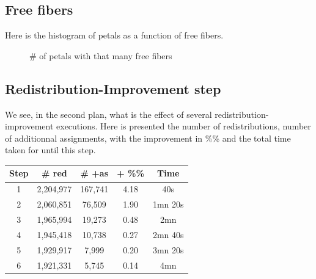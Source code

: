 \documentclass{extarticle}
\begin{document}
\begin{multicols}{2}

\subsection{Free fibers}
Here is the histogram of petals as a function of free fibers.
\begin{figure}[H]\begin{center}\caption{\# of petals with that many free fibers}
\end{center}\end{figure}
 

\subsection{Redistribution-Improvement step}
We see, in the second plan, what is the effect of several redistribution-improvement executions. Here is presented the number of redistributions, number of additionnal assignments, with the improvement in \%\% and the total time taken for until this step.

\begin{table}[H]\centering
	\begin{tabular}{c|cccc}
		Step & \# red & \# +as & + \%\% & Time \\ \hline
		1 & 2,204,977 & 167,741 & 4.18 & 40s\\
		2 & 2,060,851 & 76,509 & 1.90 & 1mn 20s\\
		3 & 1,965,994 & 19,273 & 0.48 & 2mn\\
		4 & 1,945,418 & 10,738 & 0.27 & 2mn 40s\\
		5 & 1,929,917 & 7,999 & 0.20 & 3mn 20s\\
		6 & 1,921,331 & 5,745 & 0.14 & 4mn\\
	\end{tabular}
\end{table}


\end{multicols}
\end{document}
